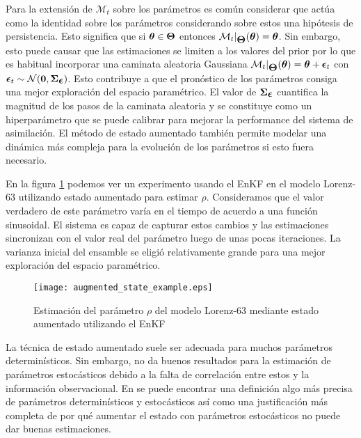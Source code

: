 Para la extensión de $\mathcal{M}_t$ sobre los parámetros es común considerar que actúa como la identidad sobre los parámetros considerando sobre estos una hipótesis de persistencia. Esto significa que si $\mbox{\boldmath$ \theta $} \in \mbox{\boldmath$ \Theta $}$ entonces $\mathcal{M}_t |_{\mbox{\boldmath$ \Theta $}} (\mbox{\boldmath$ \theta $}) = \mbox{\boldmath$ \theta $}$. Sin embargo, esto puede causar que las estimaciones se limiten a los valores del prior por lo que es habitual incorporar una caminata aleatoria Gaussiana $\mathcal{M}_t |_{\mbox{\boldmath$ \Theta $}} (\mbox{\boldmath$ \theta $}) = \mbox{\boldmath$ \theta $} + \mbox{\boldmath$ \epsilon $}_t$ con $\mbox{\boldmath$ \epsilon $}_t \sim \mathcal{N}(\mathbf{0}, \mbox{\boldmath$ \Sigma $}_{\mbox{\boldmath$ \epsilon $}})$. Esto contribuye a que el pronóstico de los parámetros consiga una mejor exploración del espacio paramétrico. El valor de $\mbox{\boldmath$ \Sigma $}_{\mbox{\boldmath$ \epsilon $}}$ cuantifica la magnitud de los pasos de la caminata aleatoria y se constituye como un hiperparámetro que se puede calibrar para mejorar la performance del sistema de asimilación. El método de estado aumentado también permite modelar una dinámica más compleja para la evolución de los parámetros si esto fuera necesario.

En la figura \ref{fig:augmented_state_example} podemos ver un experimento usando el EnKF en el modelo Lorenz-63 utilizando estado aumentado para estimar $\rho$. Consideramos que el valor verdadero de este parámetro varía en el tiempo de acuerdo a una función sinusoidal. El sistema es capaz de capturar estos cambios y las estimaciones sincronizan con el valor real del parámetro luego de unas pocas iteraciones. La varianza inicial del ensamble se eligió relativamente grande para una mejor exploración del espacio paramétrico.

\begin{figure}[h]
    \centering
    \texttt{[image: augmented\_state\_example.eps]}
    \caption{Estimación del parámetro $\rho$ del modelo Lorenz-63 mediante estado aumentado utilizando el EnKF}
    \label{fig:augmented_state_example}
\end{figure}

La técnica de estado aumentado suele ser adecuada para muchos parámetros determinísticos. Sin embargo, no da buenos resultados para la estimación de parámetros estocásticos debido a la falta de correlación entre estos y la información observacional. En \cite{Delsole2010} se puede encontrar una definición algo más precisa de parámetros determinísticos y estocásticos así como una justificación más completa de por qué aumentar el estado con parámetros estocásticos no puede dar buenas estimaciones.

